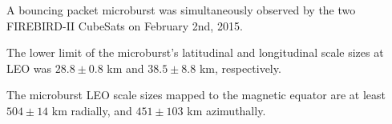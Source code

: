 \documentclass[draft,linenumbers]{agujournal}
\begin{document}






\begin{keypoints}
\item A bouncing packet microburst was simultaneously observed by the two FIREBIRD-II CubeSats on February 2nd, 2015.
\item The lower limit of the microburst's latitudinal and longitudinal scale sizes at LEO was $28.8 \pm 0.8$ km and $38.5 \pm 8.8$ km, respectively.
\item The microburst LEO scale sizes mapped to the magnetic equator are at least $504 \pm​ 14$ km radially, and $451 \pm 103$ km azimuthally.
\end{keypoints}

%
%

\end{document}
